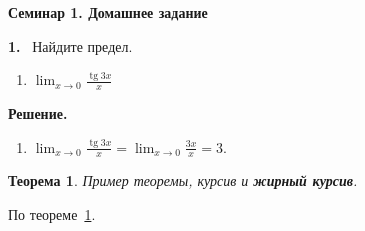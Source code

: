\documentclass[12pt,a4paper]{article}
\providecommand{\tg}{\operatorname{tg}}
\newcommand{\task}[1]{\par\vspace{1.5em}\textbf{#1.}\ }
\newcommand{\sol}{\par\textbf{Решение.}\ }
\newtheorem{theorem}{Теорема}
\begin{document}
\begin{center}\textbf{\Large Семинар 1. Домашнее задание}\end{center}

\task{1} Найдите предел.
\begin{enumerate}
\item $\lim_{x\to0}\frac{\tg 3x}{x}$
\end{enumerate}
\sol
\begin{enumerate}
\item $\lim_{x\to0}\frac{\tg 3x}{x}=\lim_{x\to0}\frac{3x}{x}=3$.
\end{enumerate}

\begin{theorem}\label{t}Пример теоремы, \textit{курсив} и \textbf{\textit{жирный курсив}}.\end{theorem}
По теореме~\ref{t}.
\end{document}
